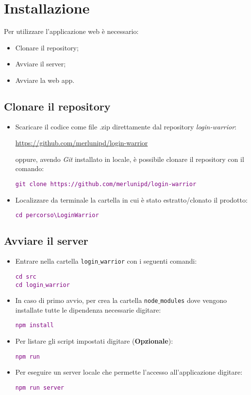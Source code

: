 \chapter{Installazione}
Per utilizzare l'applicazione web è necessario:
\begin{itemize}
  \item Clonare il repository;
  \item Avviare il server;
  \item Avviare la web app.
\end{itemize}
\section{Clonare il repository}
\begin{itemize}
  \item Scaricare il codice come file .zip direttamente dal repository \textit{login-warrior}:
  \begin{center}
    \url{https://github.com/merlunipd/login-warrior}
  \end{center}
  oppure, avendo \textit{Git} installato in locale, è possibile clonare il repository con il comando:
  \begin{center}
    \textcolor{purple}{\texttt{git clone https://github.com/merlunipd/login-warrior}}
  \end{center}
  \item Localizzare da terminale la cartella in cui è stato estratto/clonato il prodotto:
  \begin{center}
    \textcolor{purple}{\texttt{cd percorso\textbackslash LoginWarrior}}
  \end{center}
\end{itemize}

\section{Avviare il server}
\begin{itemize}
  \item Entrare nella cartella \texttt{login$\_$warrior} con i seguenti comandi:
  \begin{center}
    \textcolor{purple}{\texttt{cd src} \\
    \texttt{cd login$\_$warrior}}
  \end{center}
  \item In caso di primo avvio, per crea la cartella \texttt{node$\_$modules} dove vengono installate tutte le dipendenza necessarie digitare:
  \begin{center}
    \textcolor{purple}{\texttt{npm install}}
  \end{center}
  \item Per listare gli script impostati digitare (\textbf{Opzionale}):
  \begin{center}
    \textcolor{purple}{\texttt{npm run}}
  \end{center}
  \item Per eseguire un server locale che permette l'accesso all'applicazione digitare:
  \begin{center}
    \textcolor{purple}{\texttt{npm run server}}
  \end{center}
\end{itemize}

